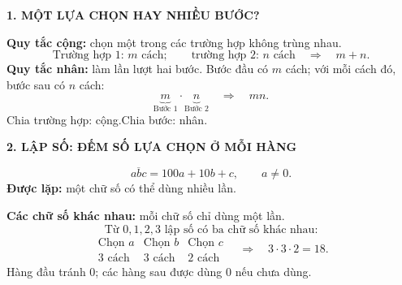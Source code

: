 \documentclass[12pt, a4paper]{article}
\begin{document}

\begin{theorybox}
\textbf{1. MỘT LỰA CHỌN HAY NHIỀU BƯỚC?}

\noindent\textbf{Quy tắc cộng:} chọn một trong các trường hợp không trùng nhau.
\[
\text{Trường hợp 1: }m\text{ cách};\qquad\text{trường hợp 2: }n\text{ cách}
\quad\Rightarrow\quad\boxed{m+n}.
\]
\noindent\textbf{Quy tắc nhân:} làm lần lượt hai bước. Bước đầu có $m$ cách; với mỗi cách đó, bước sau có $n$ cách:
\[
\underbrace{m}_{\text{Bước 1}}\cdot\underbrace{n}_{\text{Bước 2}}
\quad\Rightarrow\quad\boxed{mn}.
\]
\centering Chia trường hợp: cộng.\qquad Chia bước: nhân.
\end{theorybox}



\newpage

\begin{theorybox}
\textbf{2. LẬP SỐ: ĐẾM SỐ LỰA CHỌN Ở MỖI HÀNG}

\[
\overline{abc}=100a+10b+c,\qquad a\ne0.
\]
\noindent\textbf{Được lặp:} một chữ số có thể dùng nhiều lần.\par
\noindent\textbf{Các chữ số khác nhau:} mỗi chữ số chỉ dùng một lần.
\[
\text{Từ }0,1,2,3\text{ lập số có ba chữ số khác nhau:}
\]
\[
\begin{array}{c|c|c}
\text{Chọn }a&\text{Chọn }b&\text{Chọn }c\\\hline
3\text{ cách}&3\text{ cách}&2\text{ cách}
\end{array}
\quad\Rightarrow\quad3\cdot3\cdot2=18.
\]
\centering Hàng đầu tránh $0$; các hàng sau được dùng $0$ nếu chưa dùng.
\end{theorybox}

\end{document}
